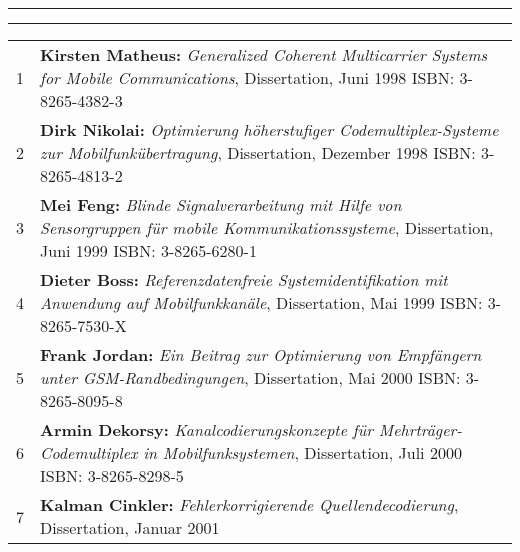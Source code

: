 \newpage
\pagestyle{empty}
\begin{center}
    \vspace*{-1.0cm}
    \hrule {}
    \vspace*{0.2cm}\hrule
    \vspace*{0.2cm}
\end{center}
\begin{tabular}{c p{}}
    1  & {\bf Kirsten Matheus:}
    {\em {G}eneralized {C}oherent {M}ulticarrier
    {S}ystems for {M}obile {C}ommunications}, Dissertation, Juni 1998\newline
    ISBN: 3-8265-4382-3         \\
    2  & {\bf Dirk Nikolai:}
    {\em {O}ptimierung h\"{o}herstufiger {C}odemultiplex-{S}ysteme zur
        {M}obilfunk\"{u}bertragung}, Dissertation, Dezember 1998\newline
    ISBN: 3-8265-4813-2         \\
    3  & {\bf Mei Feng:}
    {\em {B}linde {S}ignalverarbeitung mit {H}ilfe von {S}ensorgruppen
    f\"{u}r mobile {K}ommunikationssysteme}, Dissertation, Juni 1999\newline
    ISBN: 3-8265-6280-1         \\
    4  & {\bf Dieter Boss:}
    {\em {R}eferenzdatenfreie {S}ystemidentifikation mit {A}nwendung auf
        {M}obilfunkkan\"{a}le}, Dissertation, Mai 1999\newline
    ISBN: 3-8265-7530-X         \\
    5  & {\bf Frank Jordan:}
    {\em {E}in {B}eitrag zur {O}ptimierung von {E}mpfängern unter
        {GSM}-{R}andbedingungen}, Dissertation, Mai 2000\newline
    ISBN: 3-8265-8095-8         \\
    6  & {\bf Armin Dekorsy:}
    {\em {K}analcodierungskonzepte f\"{u}r
    {M}ehrtr\"{a}ger-{C}odemultiplex in {M}obilfunksystemen}, Dissertation, Juli 2000\newline
    ISBN: 3-8265-8298-5         \\
    7  & {\bf Kalman Cinkler:}
        {\em Fehlerkorrigierende Quellendecodierung}, Dissertation, Januar 2001\newline

\end{tabular}
